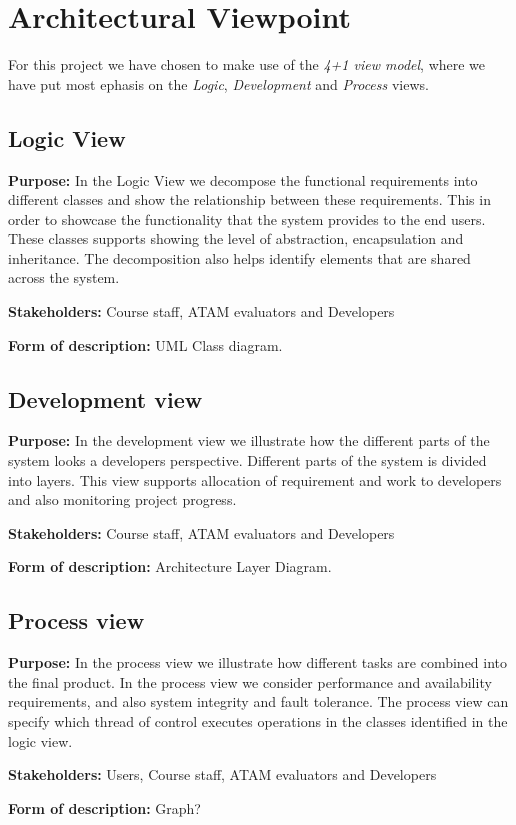 \chapter{Architectural Viewpoint}
For this project we have chosen to make use of the \emph{4+1 view model}, where we have put most ephasis on the \emph{Logic}, \emph{Development} and \emph{Process} views.

    \section{Logic View}
    \textbf{Purpose:} In the Logic View we decompose the functional requirements into different classes and show the relationship between these requirements. This in order to showcase the functionality that the system provides to the end users.
    These classes supports showing the level of abstraction, encapsulation and inheritance.%
    The decomposition also helps identify elements that are shared across the system. 
    
    \noindent\textbf{Stakeholders:} Course staff, ATAM evaluators and Developers 
    
    \noindent\textbf{Form of description:} UML Class diagram.
    
    \section{Development view}
    \textbf{Purpose:} In the development view we illustrate how the different parts of the system looks a developers perspective. Different parts of the system is divided into layers. This view supports allocation of requirement
    and work to developers and also monitoring project progress.  
    
    \noindent\textbf{Stakeholders:} Course staff, ATAM evaluators and Developers
    
    \noindent\textbf{Form of description:} Architecture Layer Diagram. 
    
    \section{Process view}
    \noindent\textbf{Purpose:} In the process view we illustrate how different tasks are combined into the final product. In the process view we consider performance and availability requirements, and also system integrity and fault tolerance.
    The process view can specify which thread of control executes operations in the classes identified in the logic view. 
    
    \noindent\textbf{Stakeholders:} Users, Course staff, ATAM evaluators and Developers 
    
    \noindent\textbf{Form of description:} Graph?